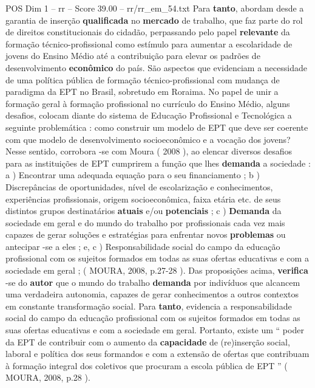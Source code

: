 \begin{textsample}{POS Dim 1 – rr – Score 39.00 – rr/rr\_em\_54.txt}
Para \textbf{tanto}, abordam desde a garantia de inserção \textbf{qualificada} no \textbf{mercado} de trabalho, que faz parte do rol de direitos constitucionais do cidadão, perpassando pelo papel \textbf{relevante} da formação técnico-profissional como estímulo para aumentar a escolaridade de jovens do Ensino Médio até a contribuição para elevar os padrões de desenvolvimento \textbf{econômico} do país.
São aspectos que evidenciam a necessidade de uma política pública de formação técnico-profissional com mudança de paradigma da EPT no Brasil, sobretudo em Roraima.
No papel de unir a formação geral à formação profissional no currículo do Ensino Médio, alguns desafios, colocam diante do sistema de Educação Profissional e Tecnológica a seguinte problemática : como construir um modelo de EPT que deve ser coerente com que modelo de desenvolvimento socioeconômico e a vocação dos jovens?
Nesse sentido, corrobora -se com Moura ( 2008 ), ao elencar diversos desafios para as instituições de EPT cumprirem a função que lhes \textbf{demanda} a sociedade : a ) Encontrar uma adequada equação para o seu financiamento ; b ) Discrepâncias de oportunidades, nível de escolarização e conhecimentos, experiências profissionais, origem socioeconômica, faixa etária etc. de seus distintos grupos destinatários \textbf{atuais} e/ou \textbf{potenciais} ; c ) \textbf{Demanda} da sociedade em geral e do mundo do trabalho por profissionais cada vez mais capazes de gerar soluções e estratégias para enfrentar novos \textbf{problemas} ou antecipar -se a eles ; e, c ) Responsabilidade social do campo da educação profissional com os sujeitos formados em todas as suas ofertas educativas e com a sociedade em geral ; ( MOURA, 2008, p.27-28 ).
Das proposições acima, \textbf{verifica} -se do \textbf{autor} que o mundo do trabalho \textbf{demanda} por indivíduos que alcancem uma verdadeira autonomia, capazes de gerar conhecimentos a outros contextos em constante transformação social.
Para \textbf{tanto}, evidencia a responsabilidade social do campo da educação profissional com os sujeitos formados em todas as suas ofertas educativas e com a sociedade em geral.
Portanto, existe um “ poder da EPT de contribuir com o aumento da \textbf{capacidade} de (re)inserção social, laboral e política dos seus formandos e com a extensão de ofertas que contribuam à formação integral dos coletivos que procuram a escola pública de EPT ” ( MOURA, 2008, p.28 ).

\end{textsample}
